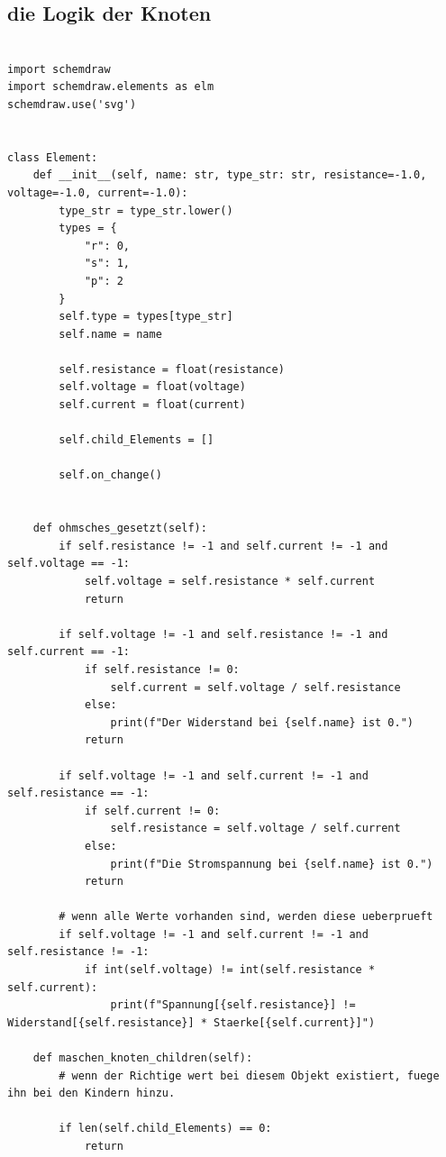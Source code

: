 \documentclass[a4paper,10pt,ngerman]{scrartcl}
\begin{document}
\subsection{die Logik der Knoten}
\label{subsec:berechnung}

\begin{lstlisting}

import schemdraw
import schemdraw.elements as elm
schemdraw.use('svg')


class Element:
    def __init__(self, name: str, type_str: str, resistance=-1.0, voltage=-1.0, current=-1.0):
        type_str = type_str.lower()
        types = {
            "r": 0,
            "s": 1,
            "p": 2
        }
        self.type = types[type_str]
        self.name = name

        self.resistance = float(resistance)
        self.voltage = float(voltage)
        self.current = float(current)

        self.child_Elements = []

        self.on_change()


    def ohmsches_gesetzt(self):
        if self.resistance != -1 and self.current != -1 and self.voltage == -1:
            self.voltage = self.resistance * self.current
            return

        if self.voltage != -1 and self.resistance != -1 and self.current == -1:
            if self.resistance != 0:
                self.current = self.voltage / self.resistance
            else:
                print(f"Der Widerstand bei {self.name} ist 0.")
            return

        if self.voltage != -1 and self.current != -1 and self.resistance == -1:
            if self.current != 0:
                self.resistance = self.voltage / self.current
            else:
                print(f"Die Stromspannung bei {self.name} ist 0.")
            return

        # wenn alle Werte vorhanden sind, werden diese ueberprueft
        if self.voltage != -1 and self.current != -1 and self.resistance != -1:
            if int(self.voltage) != int(self.resistance * self.current):
                print(f"Spannung[{self.resistance}] != Widerstand[{self.resistance}] * Staerke[{self.current}]")

    def maschen_knoten_children(self):
        # wenn der Richtige wert bei diesem Objekt existiert, fuege ihn bei den Kindern hinzu.

        if len(self.child_Elements) == 0:
            return


\end{lstlisting}
\end{document}
